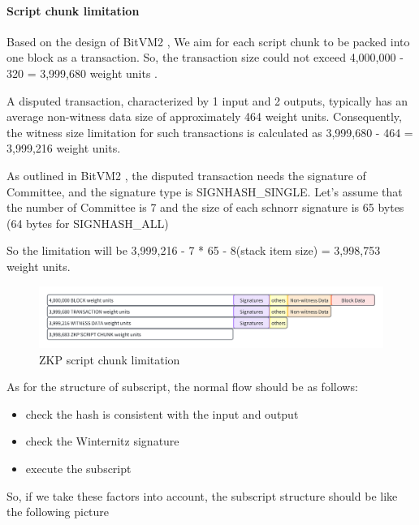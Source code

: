 \paragraph*{Script chunk limitation} 

Based on the design of BitVM2 \cite{website:BitVM2}, We aim for each script chunk to be packed into one block as a transaction.
So, the transaction size could not exceed 4,000,000 - 320 = 3,999,680 weight units \cite{website:transaction-size}.

A disputed transaction, characterized by 1 input and 2 outputs, typically has an average non-witness data size of approximately 464 weight units. 
Consequently, the witness size limitation for such transactions is calculated as 3,999,680 - 464 = 3,999,216 weight units.

As outlined in BitVM2 \cite{website:BitVM2}, the disputed transaction needs the signature of Committee, and the signature type is
SIGNHASH\_SINGLE. Let's assume that the number of Committee is 7 and the size of each schnorr signature is 65 bytes (64 bytes for SIGNHASH\_ALL)

So the limitation will be 3,999,216 - 7 * 65 - 8(stack item size) = 3,998,753 weight units.

\begin{figure}[ht] 
    \centering  
    \includegraphics[width=0.85\columnwidth]{images/ZKP-script-chunk-limitation.png} 
    \caption{ZKP script chunk limitation}
    \label{fig:ZKP-script-chunk-limitation}
\end{figure}

As for the structure of subscript, the normal flow should be as follows:

\begin{itemize}
    \item check the hash \cite{website:blake3} is consistent with the input and output
    \item check the Winternitz \cite{website:witernitz} signature
    \item execute the subscript
\end{itemize}

So, if we take these factors into account, the subscript structure should be like the following picture


